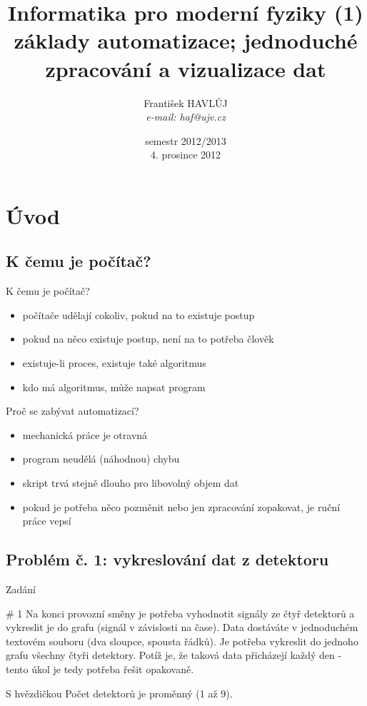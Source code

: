 \documentclass{beamer}
\title[IMF (1)]{Informatika pro moderní fyziky (1)\\základy automatizace; jednoduché zpracování a vizualizace dat}
\author[Franti\v{s}ek HAVL\r{U}J, ORF ÚJV Řež]{Franti\v{s}ek HAVL\r{U}J\\{\scriptsize \emph{e-mail: haf@ujv.cz}}}
\date{semestr 2012/2013\\4. prosince 2012}
\institute[ORF ÚJV Řež]
{ÚJV Řež\\oddělení Reaktorové fyziky a podpory palivového cyklu}
\begin{document}
\begin{frame}
  \titlepage
\end{frame}

\begin{frame}
  \tableofcontents
\end{frame}

\section{Úvod}

\subsection{K čemu je počítač?}

\begin{frame}{K čemu je počítač?}
  \begin{itemize}
    \item počítače udělají cokoliv, pokud na to existuje postup
    \item pokud na něco existuje postup, není na to potřeba člověk
    \item existuje-li proces, existuje také algoritmus
    \item kdo má algoritmus, může napsat program
  \end{itemize}
\end{frame}

\begin{frame}{Proč se zabývat automatizací?}
  \begin{itemize}
    \item mechanická práce je otravná
    \item program neudělá (náhodnou) chybu
    \item skript trvá stejně dlouho pro libovolný objem dat
    \item pokud je potřeba něco pozměnit nebo jen zpracování zopakovat, je ruční práce vepsí
  \end{itemize}
\end{frame}

\subsection{Problém č. 1: vykreslování dat z detektoru}

\begin{frame}{Zadání}
  \begin{block}{\# 1}
    Na konci provozní směny je potřeba vyhodnotit signály ze čtyř detektorů a vykreslit je do grafu (signál v závislosti na čase). Data dostáváte v jednoduchém textovém souboru (dva sloupce, spousta řádků). Je potřeba vykreslit do jednoho grafu všechny čtyři detektory. Potíž je, že taková data přicházejí každý den - tento úkol je tedy potřeba řešit opakovaně.
  \end{block}
  \begin{block}{S hvězdičkou}
    Počet detektorů je proměnný (1 až 9).
  \end{block}
\end{frame}
\end{document}
